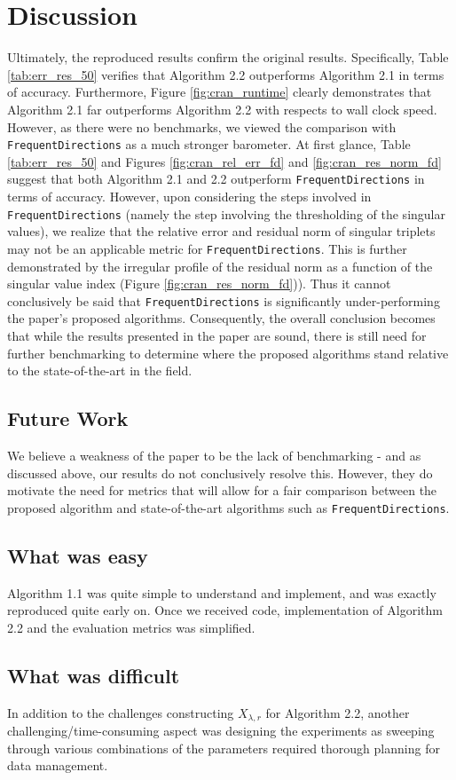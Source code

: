 \section{Discussion} \label{sec:discussion}

Ultimately, the reproduced results confirm the original results.
Specifically, Table \ref{tab:err_res_50} verifies that Algorithm 2.2 outperforms Algorithm 2.1 in terms of accuracy.
Furthermore, Figure \ref{fig:cran_runtime} clearly demonstrates that Algorithm 2.1 far outperforms Algorithm 2.2 with respects to wall clock speed.
However, as there were no benchmarks, we viewed the comparison with \verb|FrequentDirections| as a much stronger barometer.
At first glance, Table \ref{tab:err_res_50} and Figures \ref{fig:cran_rel_err_fd} and \ref{fig:cran_res_norm_fd} suggest that both Algorithm 2.1 and 2.2 outperform \verb|FrequentDirections| in terms of accuracy.
However, upon considering the steps involved in \verb|FrequentDirections| (namely the step involving the thresholding of the singular values), we realize that the relative error and residual norm of singular triplets may not be an applicable metric for \verb|FrequentDirections|.
This is further demonstrated by the irregular profile of the residual norm as a function of the singular value index (Figure \ref{fig:cran_res_norm_fd})).
Thus it cannot conclusively be said that \verb|FrequentDirections| is significantly under-performing the paper's proposed algorithms.
Consequently, the overall conclusion becomes that while the results presented in the paper are sound, there is still need for further benchmarking to determine where the proposed algorithms stand relative to the state-of-the-art in the field.

\subsection{Future Work}
We believe a weakness of the paper to be the lack of benchmarking - and as discussed above, our results do not conclusively resolve this.
However, they do motivate the need for metrics that will allow for a fair comparison between the proposed algorithm and state-of-the-art algorithms such as \verb|FrequentDirections|.

\subsection{What was easy}

Algorithm 1.1 was quite simple to understand and implement, and was exactly reproduced quite early on.
Once we received code, implementation of Algorithm 2.2 and the evaluation metrics was  simplified. 

\subsection{What was difficult}

In addition to the challenges constructing $X_{\lambda,r}$ for Algorithm 2.2, another challenging/time-consuming aspect was designing the experiments as sweeping through various combinations of the parameters required thorough planning for data management.
